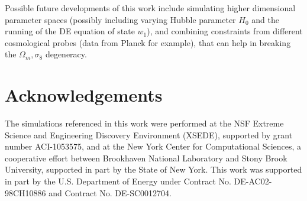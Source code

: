 \documentclass[reprint,aps,prd,superscriptaddress,showkeys,showpacs]{revtex4-1}
\begin{document}
Possible future developments of this work include simulating higher dimensional parameter spaces (possibly including varying Hubble parameter $H_0$ and the running of the DE equation of state $w_1$), and combining constraints from different cosmological probes (data from Planck for example), that can help in breaking the $\Omega_m,\sigma_8$ degeneracy. 

 

\section*{Acknowledgements}
The simulations referenced in this work were performed at the NSF Extreme Science and Engineering Discovery Environment (XSEDE), supported by grant number ACI-1053575, and at the New York Center for Computational Sciences, a cooperative effort between Brookhaven National Laboratory and Stony Brook University, supported in part by the State of New York. This work was supported in part by the U.S. Department of Energy under Contract No. DE-AC02-98CH10886 and Contract No. DE-SC0012704.


\label{lastpage}
\end{document}
